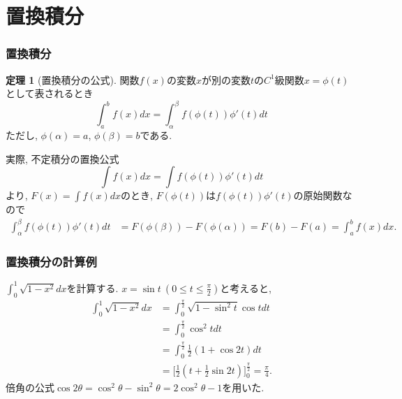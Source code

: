 \documentclass[dvipdfmx,cjk,10.2pt]{beamer}
\theoremstyle{definition}
\newtheorem{Thm}{定理}[section]
\begin{document}

\section{置換積分}

\begin{frame}
\frametitle{置換積分}

\begin{Thm}[置換積分の公式] 
関数$f(x)$の変数$x$が別の変数$t$の$C^1$級関数$x=\phi(t)$として表されるとき
$$
\int_a^b f(x)dx =\int_\alpha^\beta f(\phi(t))\phi'(t)dt
$$
ただし, $\phi(\alpha)=a$,  $\phi(\beta)=b$である. 
\end{Thm}
実際, 不定積分の置換公式
$$
\int f(x)dx =\int f(\phi(t))\phi'(t)dt
$$
より, $F(x)=\int f(x)dx$のとき, $F(\phi(t))$は$ f(\phi(t))\phi'(t)$の原始関数なので
\begin{align*}
\int_\alpha^\beta f(\phi(t))\phi'(t)dt &=  F(\phi(\beta))-F(\phi(\alpha))=F(b)-F(a)=\int_a^b f(x)dx. 
\end{align*}

\end{frame}




\begin{frame}
\frametitle{置換積分の計算例}

$\int_0^1 \sqrt{1-x^2}dx$を計算する. 
$x=\sin t \ (0 \le t \le \frac{\pi}{2})$と考えると, 
\begin{align*}
\int_0^1 \sqrt{1-x^2}dx & = \int_0^\frac{\pi}{2} \sqrt{1-\sin^2 t} \cos t dt \\
& =  \int_0^\frac{\pi}{2} \cos^2 t dt \\
& =   \int_0^\frac{\pi}{2} \frac{1}{2}(1+\cos 2t)dt \\
& = \Big[\frac{1}{2}(t+\frac{1}{2} \sin 2t) \Big]_0^\frac{\pi}{2}=\frac{\pi}{4}. 
\end{align*}
倍角の公式$\cos 2 \theta = \cos^2 \theta-\sin^2 \theta=2 \cos^2 \theta-1$を用いた. 

\end{frame}

\end{document}

